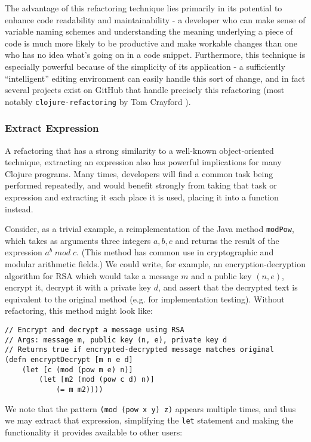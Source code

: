 The advantage of this refactoring technique lies primarily in its potential to enhance code readability and maintainability - a developer who can make sense of variable naming schemes and understanding the meaning underlying a piece of code is much more likely to be productive and make workable changes than one who has no idea what's going on in a code snippet. Furthermore, this technique is especially powerful because of the simplicity of its application - a sufficiently ``intelligent'' editing environment can easily handle this sort of change, and in fact several projects exist on GitHub that handle precisely this refactoring (most notably \verb!clojure-refactoring! by Tom Crayford \cite{clojurerefactoring}).

\subsubsection{Extract Expression}

A refactoring that has a strong similarity to a well-known object-oriented technique, extracting an expression also has powerful implications for many Clojure programs. Many times, developers will find a common task being performed repeatedly, and would benefit strongly from taking that task or expression and extracting it each place it is used, placing it into a function instead.

Consider, as a trivial example, a reimplementation of the Java method \verb!modPow!, which takes as arguments three integers $a, b, c$ and returns the result of the expression $a^{b} \; mod \; c$. (This method has common use in cryptographic and modular arithmetic fields.) We could write, for example, an encryption-decryption algorithm for RSA which would take a message $m$ and a public key $(n, e)$, encrypt it, decrypt it with a private key $d$, and assert that the decrypted text is equivalent to the original method (e.g. for implementation testing). Without refactoring, this method might look like:

\begin{verbatim}
// Encrypt and decrypt a message using RSA
// Args: message m, public key (n, e), private key d
// Returns true if encrypted-decrypted message matches original
(defn encryptDecrypt [m n e d]
    (let [c (mod (pow m e) n)]
        (let [m2 (mod (pow c d) n)]
            (= m m2))))
\end{verbatim}

We note that the pattern \verb!(mod (pow x y) z)! appears multiple times, and thus we may extract that expression, simplifying the \verb!let! statement and making the functionality it provides available to other users:


